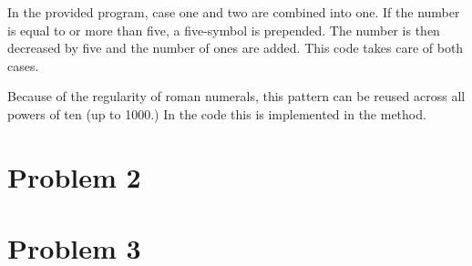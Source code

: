 \documentclass{scrartcl}
\begin{document}
In the provided program, case one and two are combined into one. If the number
is equal to or more than five, a five-symbol is prepended. The number is then
decreased by five and the number of ones are added. This code takes care of
both cases.

Because of the regularity of roman numerals, this pattern can be reused across
all powers of ten (up to 1000.) In the code this is implemented in the
 method.

\section*{Problem 2}



\section*{Problem 3}
\end{document}
